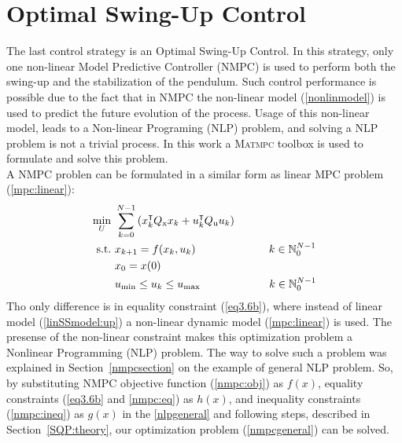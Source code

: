 \section{Optimal Swing-Up Control}
The last control strategy is an Optimal Swing-Up Control. In this strategy, only one non-linear Model Predictive Controller (NMPC) is used to perform both the swing-up and the stabilization of the pendulum. Such control performance is possible due to the fact that in NMPC the non-linear model (\ref{nonlinmodel}) is used to predict the future evolution of the process.  Usage of this non-linear model, leads to a Non-linear Programing (NLP) problem, and solving a NLP problem is not a trivial process. In this work a \textsc{Matmpc} toolbox is used \cite{Matmpc} to formulate and solve this problem.\\

A NMPC problen can be formulated in a similar form as linear MPC problem (\ref{mpc:linear}):
\begin{subequations}\label{nmpcgeneral}
	\begin{align}
	\min_{U}\ &\sum_{k=0}^{N-1} \left(  x_{k}^\intercal Q _{\text{x}}x_{k}+u_{k}^\intercal Q _{\text{u}}u_{k} \right)\label{nmpc:obj}\\
\text{s.t.}\ &x_{k+1} = f(x_{k}, u_{k})\qquad\qquad\qquad \ \   k \in \mathbb{N}_0^{N-1}\label{eq3.6b}\\
&x_0 = x(0)\label{nmpc:eq}\\
&u _{\text{min}}\leq u_{k}\leq u _{\text{max}}\qquad\qquad\qquad\;   k \in \mathbb{N}_0^{N-1}\label{nmpc:ineq}
	\end{align}
\end{subequations}
Tho only difference is in equality constraint (\ref{eq3.6b}), where instead of linear model (\ref{linSSmodel:up}) a non-linear dynamic model (\ref{mpc:linear}) is used. The presense of the non-linear constraint makes this optimization problem a Nonlinear Programming (NLP) problem. The way to solve such a problem was explained in Section~\ref{nmpcsection} on the example of general NLP problem. So, by substituting NMPC objective function (\ref{nmpc:obj}) as $f(x)$, equality constraints (\ref{eq3.6b} and \ref{nmpc:eq}) as $h(x)$, and inequality constraints (\ref{nmpc:ineq}) as $g(x)$ in the \ref{nlpgeneral} and following steps, described in Section~\ref{SQP:theory}, our optimization problem (\ref{nmpcgeneral}) can be solved.\\

